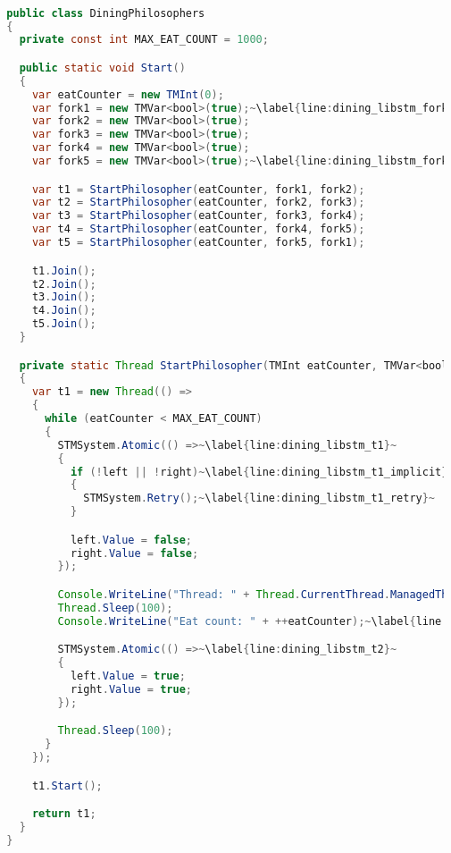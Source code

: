 \begin{lstlisting}[label=lst:impl_dining_lib,
  caption={STM Library Based Dining Philosophers Implementation},
  language=Java,  
  showspaces=false,
  showtabs=false,
  breaklines=true,
  showstringspaces=false,
  breakatwhitespace=true,
  commentstyle=\color{greencomments},
  keywordstyle=\color{bluekeywords},
  stringstyle=\color{redstrings},
  escapechar=~,
  morekeywords={atomic, retry, orelse, var, get, set, ref, out, readonly, virtual, override, region, endregion, foreach, lock}]  % Start your code-block

  public class DiningPhilosophers
  {
    private const int MAX_EAT_COUNT = 1000;

    public static void Start()
    {
      var eatCounter = new TMInt(0);
      var fork1 = new TMVar<bool>(true);~\label{line:dining_libstm_fork_start}~
      var fork2 = new TMVar<bool>(true);
      var fork3 = new TMVar<bool>(true);
      var fork4 = new TMVar<bool>(true);
      var fork5 = new TMVar<bool>(true);~\label{line:dining_libstm_fork_end}~

      var t1 = StartPhilosopher(eatCounter, fork1, fork2);
      var t2 = StartPhilosopher(eatCounter, fork2, fork3);
      var t3 = StartPhilosopher(eatCounter, fork3, fork4);
      var t4 = StartPhilosopher(eatCounter, fork4, fork5);
      var t5 = StartPhilosopher(eatCounter, fork5, fork1);

      t1.Join();
      t2.Join();
      t3.Join();
      t4.Join();
      t5.Join();
    }

    private static Thread StartPhilosopher(TMInt eatCounter, TMVar<bool> left, TMVar<bool> right)~\label{line:dining_libstm_startphil}~
    {
      var t1 = new Thread(() =>
      {
        while (eatCounter < MAX_EAT_COUNT)
        {
          STMSystem.Atomic(() =>~\label{line:dining_libstm_t1}~
          {
            if (!left || !right)~\label{line:dining_libstm_t1_implicit}~
            {
              STMSystem.Retry();~\label{line:dining_libstm_t1_retry}~
            }

            left.Value = false;
            right.Value = false;
          });

          Console.WriteLine("Thread: " + Thread.CurrentThread.ManagedThreadId + " eating.");~\label{line:dining_libstm_eatstart}~
          Thread.Sleep(100);
          Console.WriteLine("Eat count: " + ++eatCounter);~\label{line:dining_libstm_eatend}~

          STMSystem.Atomic(() =>~\label{line:dining_libstm_t2}~
          {
            left.Value = true;
            right.Value = true;
          });

          Thread.Sleep(100);
        }
      });

      t1.Start();

      return t1;
    }
  }
\end{lstlisting}


